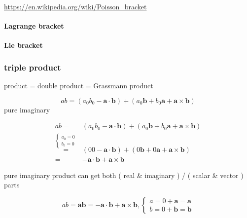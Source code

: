 \documentclass[
]{book}
\theoremstyle{definition}
\theoremstyle{definition}
\theoremstyle{definition}
\theoremstyle{definition}
\theoremstyle{remark}
\begin{document}
\url{https://en.wikipedia.org/wiki/Poisson_bracket}

\hypertarget{lagrange-bracket}{%
\paragraph{Lagrange bracket}\label{lagrange-bracket}}

\hypertarget{lie-bracket}{%
\paragraph{Lie bracket}\label{lie-bracket}}

\hypertarget{triple-product}{%
\subsubsection{triple product}\label{triple-product}}

product = double product = Grassmann product

\[
ab=\left(a_{{\scriptscriptstyle 0}}b_{{\scriptscriptstyle 0}}-\boldsymbol{a}\cdot\boldsymbol{b}\right)+\left(a_{{\scriptscriptstyle 0}}\boldsymbol{b}+b_{{\scriptscriptstyle 0}}\boldsymbol{a}+\boldsymbol{a}\times\boldsymbol{b}\right)
\]
pure imaginary

\[
\begin{aligned}
ab= & \left(a_{{\scriptscriptstyle 0}}b_{{\scriptscriptstyle 0}}-\boldsymbol{a}\cdot\boldsymbol{b}\right)+\left(a_{{\scriptscriptstyle 0}}\boldsymbol{b}+b_{{\scriptscriptstyle 0}}\boldsymbol{a}+\boldsymbol{a}\times\boldsymbol{b}\right)\\
\overset{\begin{cases}
a_{0}=0\\
b_{0}=0
\end{cases}}{=} & \left(00-\boldsymbol{a}\cdot\boldsymbol{b}\right)+\left(0\boldsymbol{b}+0\boldsymbol{a}+\boldsymbol{a}\times\boldsymbol{b}\right)\\
= & -\boldsymbol{a}\cdot\boldsymbol{b}+\boldsymbol{a}\times\boldsymbol{b}
\end{aligned}
\]

pure imaginary product can get both ( real \& imaginary ) / ( scalar \& vector ) parts

\[
ab=\boldsymbol{a}\boldsymbol{b}=-\boldsymbol{a}\cdot\boldsymbol{b}+\boldsymbol{a}\times\boldsymbol{b},\begin{cases}
a=0+\boldsymbol{a}=\boldsymbol{a}\\
b=0+\boldsymbol{b}=\boldsymbol{b}
\end{cases}
\]
\end{document}
